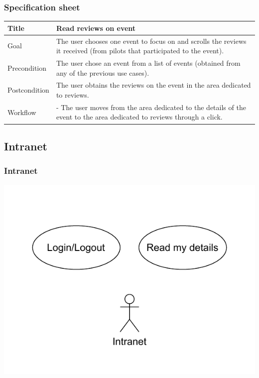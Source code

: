 \documentclass{beamer}
\begin{document}
\begin{frame}
    \frametitle{Specification sheet}
    \begin{table}
        \tiny
        \begin{tabular}{|p{2cm}|p{6cm}|}
        \hline  
        Title & \textbf{Read reviews on event} \\
        \hline
        Goal & The user chooses one event to focus on and scrolls the reviews it received (from pilots that 
        participated to the event). \\
        \hline
        Precondition & The user chose an event from a list of events (obtained from any of the previous use cases).\\
        \hline
        Postcondition & The user obtains the reviews on the event in the area dedicated to reviews. \\
        \hline
        Workflow &
        - The user moves from the area dedicated to the details of the event to the
        area dedicated to reviews through a click. \\
        \hline
        \end{tabular}
\end{table}
\end{frame}





% 
% 
% 
% 
% 
% 
% 
% 

\subsection*{Intranet}

\begin{frame}
    \frametitle{Intranet}
    \centering
    \includegraphics[width=0.7\linewidth]{drawio/intranet.pdf}
\end{frame}
\end{document}
